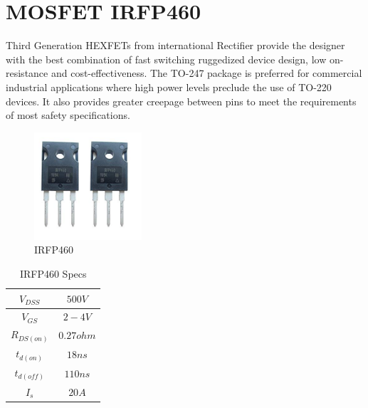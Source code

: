 \documentclass[12pt,a4paper]{report}
\begin{document}
	\section{MOSFET IRFP460}	
	Third Generation HEXFETs from international Rectifier provide the designer with the best combination of fast switching ruggedized device design, low on-resistance and cost-effectiveness. The TO-247 package is preferred for commercial industrial applications where high power levels preclude the use of TO-220 devices. It also provides greater creepage between pins to meet the requirements of most safety specifications. \\
	\begin{minipage}{10cm}
		\begin{figure}[H]
			\begin{center}
				\includegraphics[width=4cm,height=4cm]{figures/IRFP460.jpg}
			\end{center}
			\caption{IRFP460}
		\end{figure}
	\end{minipage}
	\begin{minipage}{5cm}
		\begin{table}[H]
			\begin{center}
				\begin{tabular}{|c|c|} 
					\hline
					$V_{DSS}$ & $500V$\\ 
					\hline
					$V_{GS}$ & $2-4V$ \\ 
					\hline
					$R_{DS(on)}$ & $0.27ohm$\\
					\hline
					$t_{d(on)}$& $18ns$ \\ 
					\hline					
					$t_{d(off)}$  & $110ns$ \\
					\hline
					$I_{s}$  & $20A$  \\
					\hline
				\end{tabular}
			\end{center}
			\caption{IRFP460 Specs}
		\end{table}
	\end{minipage}	
\end{document}

